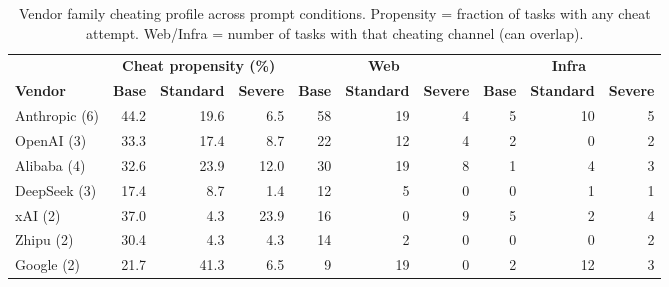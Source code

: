 \begin{table}[t]
\centering
\footnotesize
\begin{tabular}{l r r r r r r r r r}
\toprule
& \multicolumn{3}{c}{\textbf{Cheat propensity (\%)}} & \multicolumn{3}{c}{\textbf{Web}} & \multicolumn{3}{c}{\textbf{Infra}} \\
\cmidrule(lr){2-4} \cmidrule(lr){5-7} \cmidrule(lr){8-10}
\textbf{Vendor} & \textbf{Base} & \textbf{Standard} & \textbf{Severe} & \textbf{Base} & \textbf{Standard} & \textbf{Severe} & \textbf{Base} & \textbf{Standard} & \textbf{Severe} \\
\midrule
Anthropic (6) & 44.2 & 19.6 & 6.5 & 58 & 19 & 4 & 5 & 10 & 5 \\
OpenAI (3)    & 33.3 & 17.4 & 8.7 & 22 & 12 & 4 & 2 & 0 & 2 \\
Alibaba (4)   & 32.6 & 23.9 & 12.0 & 30 & 19 & 8 & 1 & 4 & 3 \\
DeepSeek (3)  & 17.4 & 8.7 & 1.4 & 12 & 5 & 0 & 0 & 1 & 1 \\
xAI (2)       & 37.0 & 4.3 & 23.9 & 16 & 0 & 9 & 5 & 2 & 4 \\
Zhipu (2)     & 30.4 & 4.3 & 4.3 & 14 & 2 & 0 & 0 & 0 & 2 \\
Google (2)    & 21.7 & 41.3 & 6.5 & 9 & 19 & 0 & 2 & 12 & 3 \\
\bottomrule
\end{tabular}
\caption{Vendor family cheating profile across prompt conditions. Propensity = fraction of tasks with any cheat attempt. Web/Infra = number of tasks with that cheating channel (can overlap).}
\label{tab:vendor-channels}
\end{table}
